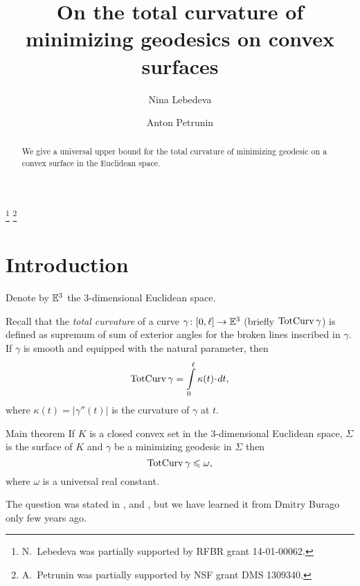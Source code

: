 \documentclass[a4paper,10pt]{amsart}
\begin{document}
\title{On the total curvature of \\
minimizing geodesics on convex surfaces}
\author{Nina Lebedeva}
\address{N. Lebedeva\newline\vskip-4mm
Math. Dept.
St. Petersburg State University,
Universitetsky pr., 28, 
Stary Peterhof, 
198504, Russia.
\newline\vskip-4mm
Steklov Institute,
27 Fontanka, St. Petersburg, 
191023, Russia.}
\author{Anton Petrunin}
\address{A. Petrunin\newline\vskip-4mm
Math. Dept. PSU,
University Park, PA 16802,
USA}
\thanks{N.~Lebedeva was partially supported by RFBR grant 
14-01-00062.}
\thanks{A.~Petrunin was partially supported by NSF grant DMS 1309340.}


\date{}

\begin{abstract}
We give a universal upper bound 
for the total curvature 
of minimizing geodesic 
on a convex surface 
in the Euclidean space.
\end{abstract}
\maketitle

\section{Introduction}

Denote by $\mathbb{E}^3$ the 3-dimensional Euclidean space.

Recall that the \emph{total curvature} of a curve $\gamma\colon[0,\ell]\to \mathbb{E}^3$ 
(briefly $\mathop{\rm TotCurv}\nolimits\gamma$)
is defined as supremum of sum of exterior angles 
for the broken lines inscribed in $\gamma$.
If $\gamma$ is smooth and equipped with the natural parameter, 
then 
\[\tc\gamma=\int\limits_0^\ell \kappa(t)\cdot dt,\]
where $\kappa(t)=|\gamma''(t)|$ is the curvature of $\gamma$ at $t$.

\begin{thm}{Main theorem}\label{thm:main}
If $K$ is a closed convex set in the 3-dimensional Euclidean space,
$\Sigma$ is the surface of $K$ 
and $\gamma$ be a minimizing geodesic in $\Sigma$
then 
\[\mathop{\rm TotCurv}\nolimits\gamma\leqslant \omega,\]
where $\omega$ is a universal real constant.
\end{thm}

The question was stated in \cite{AH-PSV}, \cite{pach} and \cite{BKZ},
but we have learned it from Dmitry Burago only few years ago.
\end{document}
